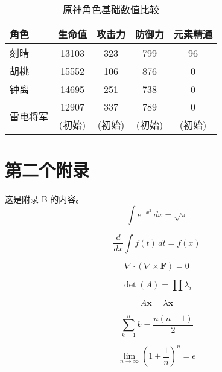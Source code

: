 \documentclass[UTF8,AutoFakeBold=1,AutoFakeSlant,zihao=-4]{SCAU}
\begin{document}
{\vspace{2cm}
\begin{table}[h] %
  \centering
  \caption{原神角色基础数值比较} %
  \label{tab:genshin} %
  \begin{tabular}{lcccc} %
    \toprule %
    \textbf{角色} & \textbf{生命值} & \textbf{攻击力} & \textbf{防御力} & \textbf{元素精通} \\
    \midrule %
    刻晴 & 13103 & 323 & 799 & 96 \\
    胡桃 & 15552 & 106 & 876 & 0 \\
    钟离 & 14695 & 251 & 738 & 0 \\
    \multirow{2}{*}{雷电将军} & 12907 & 337 & 789 & 0 \\ %
                              & (初始) & (初始) & (初始) & (初始) \\
    \bottomrule %
  \end{tabular}
\end{table}



\section{第二个附录}
这是附录 B 的内容。
\begin{equation} \label{eq1}
\int e^{-x^2} \, dx = \sqrt{\pi}
\end{equation}

\begin{equation} \label{eq2}
\frac{d}{dx} \int f(t) \, dt = f(x)
\end{equation}

\begin{equation} \label{eq3}
\nabla \cdot (\nabla \times \mathbf{F}) = 0
\end{equation}

\begin{equation} \label{eq4}
\det(A) = \prod \lambda_i
\end{equation}

\begin{equation} \label{eq5}
A \mathbf{x} = \lambda \mathbf{x}
\end{equation}

\begin{equation} \label{eq6}
\sum_{k=1}^n k = \frac{n(n+1)}{2}
\end{equation}

\begin{equation} \label{eq7}
\lim_{n \to \infty} \left(1 + \frac{1}{n}\right)^n = e
\end{equation}

}
\end{document}
